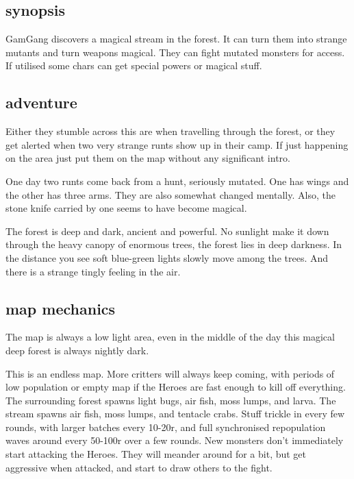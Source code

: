 \subsection*{synopsis}

GamGang discovers a magical stream in the forest. It can turn them into strange mutants and turn weapons magical. They can fight mutated monsters for access. If utilised some chars can get special powers or magical stuff.


\subsection*{adventure}

Either they stumble across this are when travelling through the forest, or they get alerted when two very strange runts show up in their camp. If just happening on the area just put them on the map without any significant intro.

One day two runts come back from a hunt, seriously mutated. One has wings and the other has three arms. They are also somewhat changed mentally. Also, the stone knife carried by one seems to have become magical.

\begin{readoutloud}
The forest is deep and dark, ancient and powerful. No sunlight make it down through the heavy canopy of enormous trees, the forest lies in deep darkness. In the distance you see soft blue-green lights slowly move among the trees. And there is a strange tingly feeling in the air.
\end{readoutloud}


\subsection*{map mechanics}

The map is always a low light area, even in the middle of the day this magical deep forest is always nightly dark.

This is an endless map. More critters will always keep coming, with periods of low population or empty map if the Heroes are fast enough to kill off everything. The surrounding forest spawns light bugs, air fish, moss lumps, and larva. The stream spawns air fish, moss lumps, and tentacle crabs. Stuff trickle in every few rounds, with larger batches every 10-20r, and full synchronised repopulation waves around every 50-100r over a few rounds. New monsters don't immediately start attacking the Heroes. They will meander around for a bit, but get aggressive when attacked, and start to draw others to the fight.

